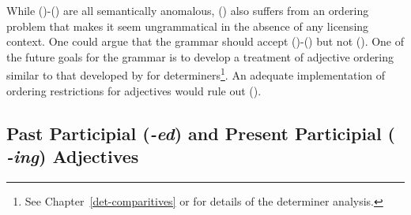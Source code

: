 While ()-() are all semantically anomalous, () also
suffers from an ordering problem that makes it seem ungrammatical in
the absence of any licensing context. One could argue that the grammar
should accept ()-() but not ().  One of the future
goals for the grammar is to develop a treatment of adjective ordering
similar to that developed by
\cite{ircs:det98} for determiners\footnote{See
Chapter~\ref{det-comparitives} or \cite{ircs:det98} for details of the
determiner analysis.}. An adequate implementation of ordering
restrictions for adjectives would rule out ().

\subsection{Past Participial ({\it -ed}) and Present Participial ({\it
-ing}) Adjectives}

